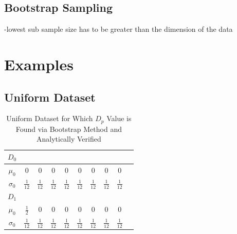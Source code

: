 \documentclass{article}
\begin{document}
	\subsection*{\small Bootstrap Sampling}

	-lowest sub sample size has to be greater than the dimension of the data
	
	
	\section*{Examples}
	
	\subsection*{\small Uniform Dataset}

	\begin{table}[ht]
	\caption{Uniform Dataset for Which $D_p$ Value is Found via Bootstrap Method and Analytically Verified}
	\centering %
	\begin{tabular}{c c c c c c c c c c} %
	$D_0$ &  &  &  \\ [0.5ex] %
	\hline %
	$\mu_0$ & 0 & 0 & 0 & 0 & 0 & 0 & 0 & 0\\[0.5ex] %
	$\sigma_0$ & \( \frac{1}{12} \) & \( \frac{1}{12} \) & \( \frac{1}{12} \) & \( \frac{1}{12} \) & \( \frac{1}{12} \) & \( \frac{1}{12} \) & \( \frac{1}{12} \) & \( \frac{1}{12} \) &  \\[2ex]

	$D_1$ & \\ [0.5ex]
	
	\hline
	$\mu_0$ & \( \frac{1}{2} \) & 0 & 0 & 0 & 0 & 0 & 0 & 0\\[0.5ex] %
	$\sigma_0$ & \( \frac{1}{12} \) & \( \frac{1}{12} \) & \( \frac{1}{12} \) & \( \frac{1}{12} \) & \( \frac{1}{12} \) & \( \frac{1}{12} \) & \( \frac{1}{12} \) & \( \frac{1}{12} \) &  \\ [1ex] %
	\hline %
	\end{tabular}
	\label{table:nonlin} %
	\end{table}

				
		
		
		
\end{document}
